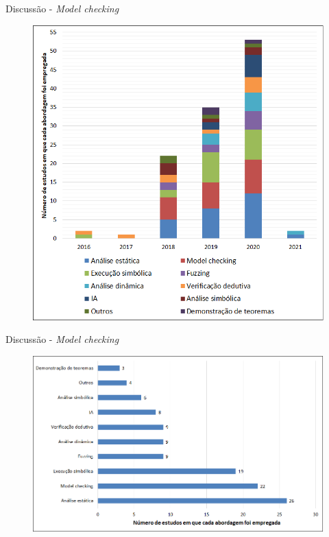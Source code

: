 \begin{frame}{Discussão - \textit{Model checking}}
    \begin{figure}[!htb]
		\centering
		\includegraphics[scale=0.35]{figuras/metodologia/rq2-distribuicao-abordagens.png}
	\end{figure}
\end{frame}

\begin{frame}{Discussão - \textit{Model checking}}
    \begin{figure}[!htb]
		\centering
		\includegraphics[scale=0.4]{figuras/metodologia/rq1-abordagens.png}
	\end{figure}
\end{frame}

